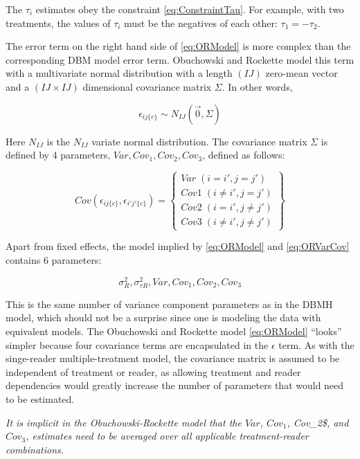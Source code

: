 \documentclass[
]{book}
\begin{document}
The \(\tau_i\) estimates obey the constraint \eqref{eq:ConstraintTau}. For example, with two treatments, the values of \(\tau_i\) must be the negatives of each other: \(\tau_1=-\tau_2\).

The error term on the right hand side of \eqref{eq:ORModel} is more complex than the corresponding DBM model error term. Obuchowski and Rockette model this term with a multivariate normal distribution with a length \((IJ)\) zero-mean vector and a \((IJ \times IJ)\) dimensional covariance matrix \(\Sigma\). In other words,

\begin{equation}
\epsilon_{ij\{c\}} \sim N_{IJ}(\vec{0},\Sigma)
\label{eq:OREpsSampling}
\end{equation}

Here \(N_{IJ}\) is the \(N_{IJ}\) variate normal distribution. The covariance matrix \(\Sigma\) is defined by 4 parameters, \(Var, Cov_1, Cov_2, Cov_3\), defined as follows:

\begin{equation}
Cov(\epsilon_{ij\{c\}},\epsilon_{i'j'\{c\}}) =
\left\{\begin{matrix}
Var \; (i=i',j=j') \\
Cov1 \; (i\ne i',j=j')\\ 
Cov2 \; (i = i',j \ne j')\\ 
Cov3 \; (i\ne i',j \ne j')
\end{matrix}\right\}
\label{eq:ORVarCov}
\end{equation}

Apart from fixed effects, the model implied by \eqref{eq:ORModel} and \eqref{eq:ORVarCov} contains 6 parameters:

\[\sigma_R^2,\sigma_{\tau R}^2,Var,Cov_1,Cov_2,Cov_3\]

This is the same number of variance component parameters as in the DBMH model, which should not be a surprise since one is modeling the data with equivalent models. The Obuchowski and Rockette model \eqref{eq:ORModel} ``looks'' simpler because four covariance terms are encapsulated in the \(\epsilon\) term. As with the singe-reader multiple-treatment model, the covariance matrix is assumed to be independent of treatment or reader, as allowing treatment and reader dependencies would greatly increase the number of parameters that would need to be estimated.

\emph{It is implicit in the Obuchowski-Rockette model that the \(Var\), \(Cov_1\), Cov\_2\$, and \(Cov_3\), estimates need to be averaged over all applicable treatment-reader combinations.}
\end{document}
